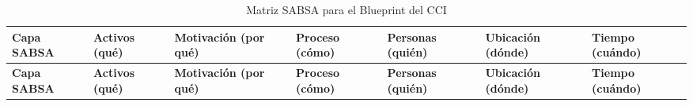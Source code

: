 \begin{landscape}

	\begingroup
	\pagestyle{plain}

	\scriptsize
	\setlength{\tabcolsep}{2pt}
	\renewcommand{\arraystretch}{1.05}
	\setlength{\LTleft}{0pt}
	\setlength{\LTpre}{0pt}
	\setlength{\LTpost}{0pt}

	\begin{longtable}{
			>{\raggedright\arraybackslash}p{1.7cm}
			>{\raggedright\arraybackslash}p{2.9cm}
			>{\raggedright\arraybackslash}p{2.9cm}
			>{\raggedright\arraybackslash}p{2.9cm}
			>{\raggedright\arraybackslash}p{2.9cm}
			>{\raggedright\arraybackslash}p{2.9cm}
			>{\raggedright\arraybackslash}p{2.9cm}
		}

		\caption{Matriz SABSA para el Blueprint del CCI}
		\label{tab:matriz_sabsa_blueprint}                                                              \\

		\toprule
		\textbf{Capa SABSA}                                                                       &
		\textbf{Activos (qué)}                                                                    &
		\textbf{Motivación (por qué)}                                                             &
		\textbf{Proceso (cómo)}                                                                   &
		\textbf{Personas (quién)}                                                                 &
		\textbf{Ubicación (dónde)}                                                                &
		\textbf{Tiempo (cuándo)}                                                                        \\
		\midrule
		\endfirsthead

		\toprule
		\textbf{Capa SABSA}                                                                       &
		\textbf{Activos (qué)}                                                                    &
		\textbf{Motivación (por qué)}                                                             &
		\textbf{Proceso (cómo)}                                                                   &
		\textbf{Personas (quién)}                                                                 &
		\textbf{Ubicación (dónde)}                                                                &
		\textbf{Tiempo (cuándo)}                                                                        \\
		\midrule
		\endhead


\end{longtable}
\end{landscape}
